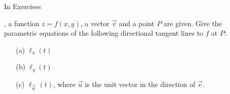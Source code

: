 {\noindent In Exercises}
{, a function $z=f(x,y)$, a vector $\vec v$ and a point $P$ are given. Give the parametric equations of the following directional tangent lines to $f$ at $P$:
\begin{enumerate}
	\item [(a)] $\ell_x(t)$
	\item [(b)] $\ell_y(t)$
	\item [(c)] $\ell_{\vec u\,}(t)$, where $\vec u$ is the unit vector in the direction of $\vec v$.
\end{enumerate}
}
